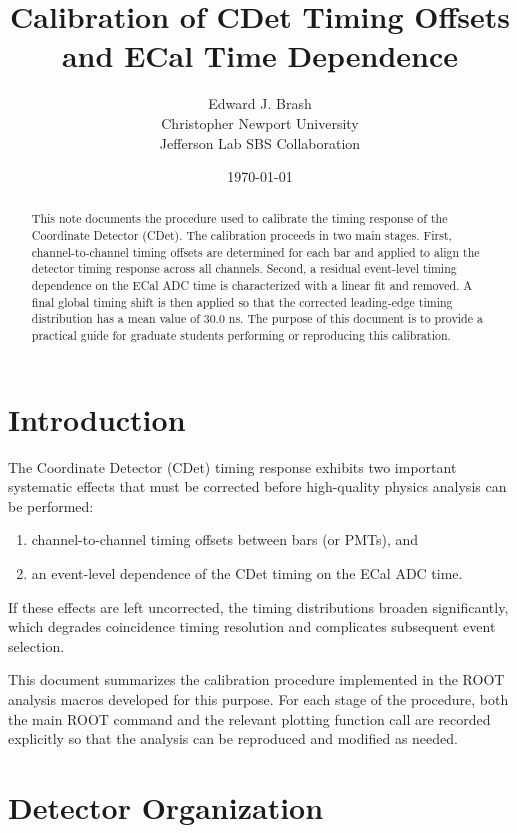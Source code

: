 \documentclass[11pt]{article}
\title{Calibration of CDet Timing Offsets and ECal Time Dependence}
\author{Edward J. Brash\\
Christopher Newport University\\
Jefferson Lab SBS Collaboration}
\date{\today}
\begin{document}
\maketitle

\begin{abstract}
This note documents the procedure used to calibrate the timing response of the Coordinate Detector (CDet). The calibration proceeds in two main stages. First, channel-to-channel timing offsets are determined for each bar and applied to align the detector timing response across all channels. Second, a residual event-level timing dependence on the ECal ADC time is characterized with a linear fit and removed. A final global timing shift is then applied so that the corrected leading-edge timing distribution has a mean value of 30.0 ns. The purpose of this document is to provide a practical guide for graduate students performing or reproducing this calibration.
\end{abstract}

\tableofcontents
\newpage

\section{Introduction}

The Coordinate Detector (CDet) timing response exhibits two important systematic effects that must be corrected before high-quality physics analysis can be performed:

\begin{enumerate}
    \item channel-to-channel timing offsets between bars (or PMTs), and
    \item an event-level dependence of the CDet timing on the ECal ADC time.
\end{enumerate}

If these effects are left uncorrected, the timing distributions broaden significantly, which degrades coincidence timing resolution and complicates subsequent event selection.

This document summarizes the calibration procedure implemented in the ROOT analysis macros developed for this purpose. For each stage of the procedure, both the main ROOT command and the relevant plotting function call are recorded explicitly so that the analysis can be reproduced and modified as needed.

\section{Detector Organization}
\end{document}
